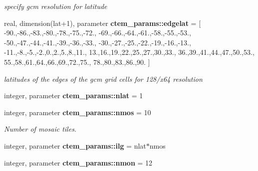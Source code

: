 \begin{DoxyCompactItemize}
\begin{DoxyCompactList}\small\item\em specify gcm resolution for latitude \end{DoxyCompactList}\item 
\hypertarget{namespacectem__params_ae540e0248a149a2d22fb9888a8cb113e}{}real, dimension(lat+1), parameter {\bfseries ctem\+\_\+params\+::edgelat} = \mbox{[} -\/90.,-\/86.,-\/83.,-\/80.,-\/78.,-\/75.,-\/72., -\/69.,-\/66.,-\/64.,-\/61.,-\/58.,-\/55.,-\/53., -\/50.,-\/47.,-\/44.,-\/41.,-\/39.,-\/36.,-\/33., -\/30.,-\/27.,-\/25.,-\/22.,-\/19.,-\/16.,-\/13., -\/11.,-\/8.,-\/5.,-\/2.,0.,2.,5.,8.,11., 13.,16.,19.,22.,25.,27.,30.,33., 36.,39.,41.,44.,47.,50.,53., 55.,58.,61.,64.,66.,69.,72.,75., 78.,80.,83.,86.,90. \mbox{]}\label{namespacectem__params_ae540e0248a149a2d22fb9888a8cb113e}

\begin{DoxyCompactList}\small\item\em latitudes of the edges of the gcm grid cells for 128/x64 resolution \end{DoxyCompactList}\item 
\hypertarget{namespacectem__params_aed4f6795fdebbed671839f1af3b98a9e}{}integer, parameter {\bfseries ctem\+\_\+params\+::nlat} = 1\label{namespacectem__params_aed4f6795fdebbed671839f1af3b98a9e}

\item 
\hypertarget{namespacectem__params_acc702cf69e445c30a2cf60576fdd86f2}{}integer, parameter {\bfseries ctem\+\_\+params\+::nmos} = 10\label{namespacectem__params_acc702cf69e445c30a2cf60576fdd86f2}

\begin{DoxyCompactList}\small\item\em Number of mosaic tiles. \end{DoxyCompactList}\item 
\hypertarget{namespacectem__params_a95fae29beaeaf9da9c112dbb76ab02db}{}integer, parameter {\bfseries ctem\+\_\+params\+::ilg} = nlat$\ast$nmos\label{namespacectem__params_a95fae29beaeaf9da9c112dbb76ab02db}

\item 
\hypertarget{namespacectem__params_a7d9aa770be284cd553a5356105ce73fb}{}integer, parameter {\bfseries ctem\+\_\+params\+::nmon} = 12\label{namespacectem__params_a7d9aa770be284cd553a5356105ce73fb}


\end{DoxyCompactItemize}
